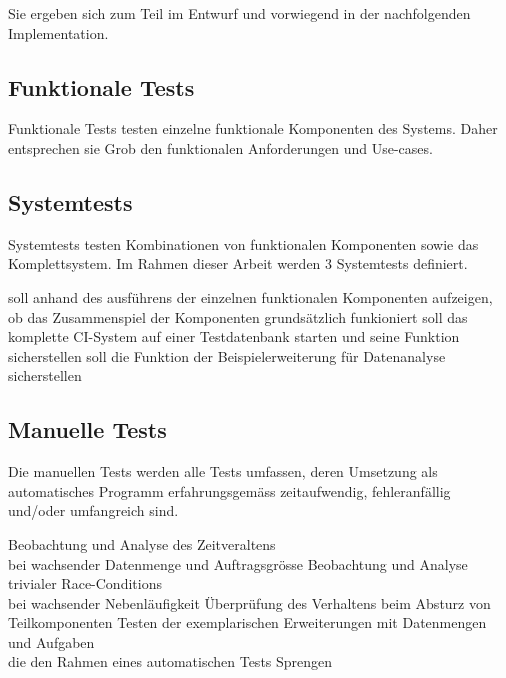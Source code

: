 Sie ergeben sich zum Teil im Entwurf und vorwiegend in
der nachfolgenden Implementation.

\subsection{Funktionale Tests}

Funktionale Tests testen einzelne funktionale Komponenten des Systems.
Daher entsprechen sie Grob den funktionalen Anforderungen und Use-cases.

\subsection{Systemtests}

Systemtests testen Kombinationen von funktionalen Komponenten sowie das Komplettsystem.
Im Rahmen dieser Arbeit werden 3 Systemtests definiert.


\begin{description}
  \dhitem[Komponentendurchlauf]
    soll anhand des ausf\"uhrens der einzelnen funktionalen Komponenten
    aufzeigen, ob das Zusammenspiel der Komponenten
    grunds\"atzlich funkioniert
  \dhitem[Komplettstystem]
    soll das komplette CI-System auf einer Testdatenbank starten
    und seine Funktion sicherstellen
    soll die Funktion der Beispielerweiterung f\"ur Datenanalyse sicherstellen
\end{description}

\subsection{Manuelle Tests}

Die manuellen Tests werden alle Tests umfassen,
deren Umsetzung als automatisches Programm erfahrungsgem\"ass zeitaufwendig,
fehleranf\"allig und/oder umfangreich sind.


\begin{description}
    Beobachtung und Analyse des Zeitveraltens \\
    bei wachsender Datenmenge und Auftragsgr\"osse
    Beobachtung und Analyse trivialer Race-Conditions \\
    bei wachsender Nebenl\"aufigkeit
    \"Uberpr\"ufung des Verhaltens beim Absturz von Teilkomponenten
    Testen der exemplarischen Erweiterungen mit Datenmengen und Aufgaben \\
    die den Rahmen eines automatischen Tests Sprengen
\end{description}

